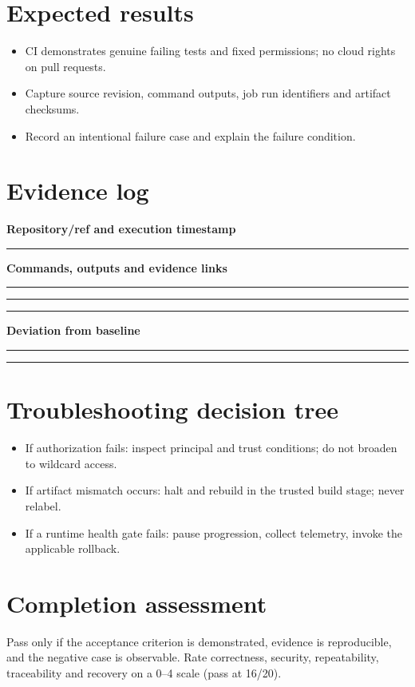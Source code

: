 \documentclass[10pt,letterpaper]{article}
\begin{document}
\section{Expected results}
\begin{itemize}
\item CI demonstrates genuine failing tests and fixed permissions; no cloud rights on pull requests.
\item Capture source revision, command outputs, job run identifiers and artifact checksums.
\item Record an intentional failure case and explain the failure condition.
\end{itemize}

\section{Evidence log}
\textbf{Repository/ref and execution timestamp}\par
\noindent\rule{\linewidth}{0.35pt}\par\vspace{0.7em}
\textbf{Commands, outputs and evidence links}\par
\noindent\rule{\linewidth}{0.35pt}\par\vspace{0.7em}
\noindent\rule{\linewidth}{0.35pt}\par\vspace{0.7em}
\noindent\rule{\linewidth}{0.35pt}\par\vspace{0.7em}
\textbf{Deviation from baseline}\par
\noindent\rule{\linewidth}{0.35pt}\par\vspace{0.7em}
\noindent\rule{\linewidth}{0.35pt}\par\vspace{0.7em}

\section{Troubleshooting decision tree}
\begin{itemize}
\item If authorization fails: inspect principal and trust conditions; do not broaden to wildcard access.
\item If artifact mismatch occurs: halt and rebuild in the trusted build stage; never relabel.
\item If a runtime health gate fails: pause progression, collect telemetry, invoke the applicable rollback.
\end{itemize}

\section{Completion assessment}
Pass only if the acceptance criterion is demonstrated, evidence is reproducible, and the negative case is observable. Rate correctness, security, repeatability, traceability and recovery on a 0--4 scale (pass at 16/20).
\end{document}
